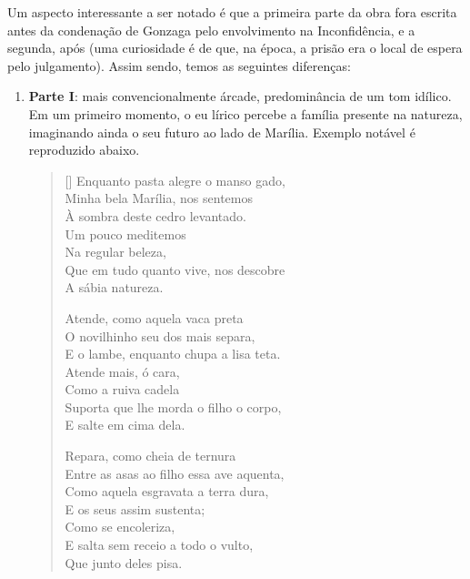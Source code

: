 \documentclass[12pt]{book}
\begin{document}
				\par Um aspecto interessante a ser notado é que a primeira parte da obra fora escrita antes da condenação de Gonzaga pelo envolvimento na Inconfidência, e a segunda, após (uma curiosidade é de que, na época, a prisão era o local de espera pelo julgamento). Assim sendo, temos as seguintes diferenças:
				\begin{enumerate}
					\item \textbf{Parte I}: mais convencionalmente árcade, predominância de um tom idílico. Em um primeiro momento, o eu lírico percebe a família presente na natureza, imaginando ainda o seu futuro ao lado de Marília. Exemplo notável é reproduzido abaixo.
					\settowidth{\versewidth}{Minha bela Marília, nos sentemos}
					\begin{verse}[\versewidth]
						Enquanto pasta alegre o manso gado, \\
						Minha bela Marília, nos sentemos \\
						À sombra deste cedro levantado. \\
						\hspace{2em} Um pouco meditemos \\
						\hspace{2em} Na regular beleza, \\
						Que em tudo quanto vive, nos descobre \\
						\hspace{2em} A sábia natureza.
						
						Atende, como aquela vaca preta \\
						O novilhinho seu dos mais separa, \\
						E o lambe, enquanto chupa a lisa teta. \\
						\hspace{2em} Atende mais, ó cara, \\
						\hspace{2em} Como a ruiva cadela \\
						Suporta que lhe morda o filho o corpo, \\
						\hspace{2em} E salte em cima dela.
						
						Repara, como cheia de ternura \\
						Entre as asas ao filho essa ave aquenta, \\
						Como aquela esgravata a terra dura, \\
						\hspace{2em} E os seus assim sustenta; \\
						\hspace{2em} Como se encoleriza, \\
						E salta sem receio a todo o vulto, \\
						\hspace{2em} Que junto deles pisa.
						

\end{verse}
\end{enumerate}
\end{document}
